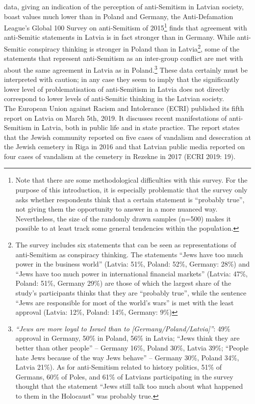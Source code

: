 data, giving an indication of the perception of anti-Semitism in Latvian society, boast values much lower than in Poland and Germany, the Anti-Defamation League’s Global 100 Survey on anti-Semitism of 2015\footnote{Note that there are some methodological difficulties with this survey. For the purpose of this introduction, it is especially problematic that the survey only asks whether respondents think that a certain statement is ``probably true'', not giving them the opportunity to answer in a more nuanced way. Nevertheless, the size of the randomly drawn samples (n=500) makes it possible to at least track some general tendencies within the population.} finds that agreement with anti-Semitic statements in Latvia is in fact stronger than in Germany. While anti-Semitic conspiracy thinking is stronger in Poland than in Latvia\footnote{The survey includes six statements that can be seen as representations of anti-Semitism as conspiracy thinking. The statements ``Jews have too much power in the business world'' (Latvia: 51\%, Poland: 52\%, Germany: 28\%) and ``Jews have too much power in international financial markets'' (Latvia: 47\%, Poland: 51\%, Germany 29\%) are those of which the largest share of the study’s participants thinks that they are ``probably true'', while the sentence ``Jews are responsible for most of the world's wars'' is met with the least approval (Latvia: 12\%, Poland: 14\%, Germany: 9\%)}, some of the statements that represent anti-Semitism as an inter-group conflict are met with about the same agreement in Latvia as in Poland.\footnote{\textit{``Jews are more loyal to Israel than to [Germany/Poland/Latvia]''}: 49\% approval in Germany, 50\% in Poland, 56\% in Latvia; ``Jews think they are better than other people'' – Germany 16\%, Poland 30\%, Latvia 39\%; ``People hate Jews because of the way Jews behave'' – Germany 30\%, Poland 34\%, Latvia 21\%). As for anti-Semitism related to history politics, 51\% of Germans, 60\% of Poles, and 61\% of Latvians participating in the survey thought that the statement ``Jews still talk too much about what happened to them in the Holocaust'' was probably true.}  These data certainly must be interpreted with caution; in any case they seem to imply that the significantly lower level of problematisation of anti-Semitism in Latvia does not directly correspond to lower levels of anti-Semitic thinking in the Latvian society.  \\
The European Union against Racism and Intolerance (ECRI) published its fifth report on Latvia on March 5th, 2019. It discusses recent manifestations of anti-Semitism in Latvia, both in public life and in state practice. The report states that the Jewish community reported on five cases of vandalism and desecration at the Jewish cemetery in Riga in 2016 and that Latvian public media reported on four cases of vandalism at the cemetery in Rezekne in 2017 (ECRI 2019: 19).\\

